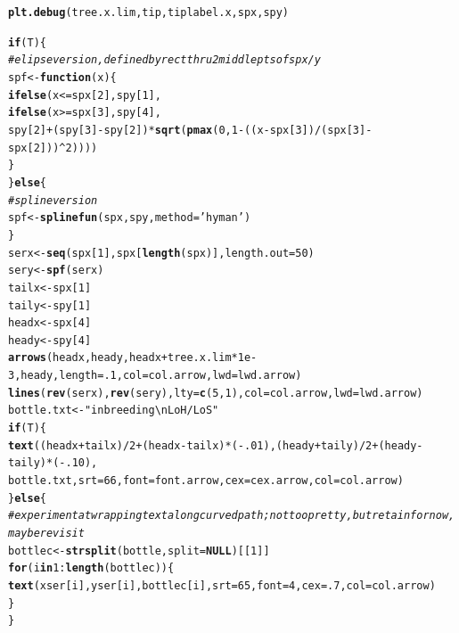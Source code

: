 \documentclass{article}\usepackage[]{graphicx}\usepackage[]{color}
\makeatletter
\newcommand{\hlnum}[1]{\textcolor[rgb]{0.686,0.059,0.569}{#1}}%
\newcommand{\hlstr}[1]{\textcolor[rgb]{0.192,0.494,0.8}{#1}}%
\newcommand{\hlcom}[1]{\textcolor[rgb]{0.678,0.584,0.686}{\textit{#1}}}%
\newcommand{\hlopt}[1]{\textcolor[rgb]{0,0,0}{#1}}%
\newcommand{\hlstd}[1]{\textcolor[rgb]{0.345,0.345,0.345}{#1}}%
\newcommand{\hlkwa}[1]{\textcolor[rgb]{0.161,0.373,0.58}{\textbf{#1}}}%
\newcommand{\hlkwb}[1]{\textcolor[rgb]{0.69,0.353,0.396}{#1}}%
\newcommand{\hlkwc}[1]{\textcolor[rgb]{0.333,0.667,0.333}{#1}}%
\newcommand{\hlkwd}[1]{\textcolor[rgb]{0.737,0.353,0.396}{\textbf{#1}}}%
\newenvironment{kframe}{%
 \def\at@end@of@kframe{}%
 \ifinner\ifhmode%
  \def\at@end@of@kframe{\end{minipage}}%
  \begin{minipage}{\columnwidth}%
 \fi\fi%
 \def\FrameCommand##1{\hskip\@totalleftmargin \hskip-\fboxsep
 \colorbox{shadecolor}{##1}\hskip-\fboxsep
     \hskip-\linewidth \hskip-\@totalleftmargin \hskip\columnwidth}%
 \MakeFramed {\advance\hsize-\width
   \@totalleftmargin\z@ \linewidth\hsize
   \@setminipage}}%
 {\par\unskip\endMakeFramed%
 \at@end@of@kframe}
\newenvironment{knitrout}{}{} %
\makeatother
\begin{document}
\begin{knitrout}
\begin{kframe}
\begin{alltt}
  \hlkwd{plt.debug}\hlstd{(tree.x.lim, tip, tiplabel.x, spx, spy)}

  \hlkwa{if}\hlstd{(T)\{}
    \hlcom{#elipse version, defined by rect thru 2 middle pts of spx/y}
    \hlstd{spf}\hlkwb{<-}\hlkwa{function}\hlstd{(}\hlkwc{x}\hlstd{)\{}
      \hlkwd{ifelse}\hlstd{(x} \hlopt{<=} \hlstd{spx[}\hlnum{2}\hlstd{], spy[}\hlnum{1}\hlstd{],}
             \hlkwd{ifelse}\hlstd{(x} \hlopt{>=} \hlstd{spx[}\hlnum{3}\hlstd{], spy[}\hlnum{4}\hlstd{],}
                    \hlstd{spy[}\hlnum{2}\hlstd{]}\hlopt{+}\hlstd{(spy[}\hlnum{3}\hlstd{]}\hlopt{-}\hlstd{spy[}\hlnum{2}\hlstd{])}\hlopt{*}\hlkwd{sqrt}\hlstd{(}\hlkwd{pmax}\hlstd{(}\hlnum{0}\hlstd{,}\hlnum{1}\hlopt{-}\hlstd{((x}\hlopt{-}\hlstd{spx[}\hlnum{3}\hlstd{])}\hlopt{/}\hlstd{(spx[}\hlnum{3}\hlstd{]}\hlopt{-}\hlstd{spx[}\hlnum{2}\hlstd{]))}\hlopt{^}\hlnum{2}\hlstd{))))}
      \hlstd{\}}
  \hlstd{\}} \hlkwa{else} \hlstd{\{}
    \hlcom{# spline version}
    \hlstd{spf} \hlkwb{<-} \hlkwd{splinefun}\hlstd{(spx,spy,}\hlkwc{method}\hlstd{=}\hlstr{'hyman'}\hlstd{)}
  \hlstd{\}}
  \hlstd{serx} \hlkwb{<-} \hlkwd{seq}\hlstd{(spx[}\hlnum{1}\hlstd{],spx[}\hlkwd{length}\hlstd{(spx)],}\hlkwc{length.out}\hlstd{=}\hlnum{50}\hlstd{)}
  \hlstd{sery} \hlkwb{<-} \hlkwd{spf}\hlstd{(serx)}
  \hlstd{tailx} \hlkwb{<-} \hlstd{spx[}\hlnum{1}\hlstd{]}
  \hlstd{taily} \hlkwb{<-} \hlstd{spy[}\hlnum{1}\hlstd{]}
  \hlstd{headx} \hlkwb{<-} \hlstd{spx[}\hlnum{4}\hlstd{]}
  \hlstd{heady} \hlkwb{<-} \hlstd{spy[}\hlnum{4}\hlstd{]}
  \hlkwd{arrows}\hlstd{(headx,heady,headx}\hlopt{+}\hlstd{tree.x.lim}\hlopt{*}\hlnum{1e-3}\hlstd{,heady,} \hlkwc{length}\hlstd{=}\hlnum{.1}\hlstd{,}\hlkwc{col}\hlstd{=col.arrow,}\hlkwc{lwd}\hlstd{=lwd.arrow)}
  \hlkwd{lines}\hlstd{(}\hlkwd{rev}\hlstd{(serx),} \hlkwd{rev}\hlstd{(sery),} \hlkwc{lty}\hlstd{=}\hlkwd{c}\hlstd{(}\hlnum{5}\hlstd{,}\hlnum{1}\hlstd{),}\hlkwc{col}\hlstd{=col.arrow,} \hlkwc{lwd}\hlstd{=lwd.arrow)}
  \hlstd{bottle.txt} \hlkwb{<-} \hlstr{"inbreeding\textbackslash{}nLoH / LoS"}
  \hlkwa{if}\hlstd{(T)\{}
    \hlkwd{text}\hlstd{((headx}\hlopt{+}\hlstd{tailx)}\hlopt{/}\hlnum{2}\hlopt{+}\hlstd{(headx}\hlopt{-}\hlstd{tailx)}\hlopt{*}\hlstd{(}\hlopt{-}\hlnum{.01}\hlstd{), (heady}\hlopt{+}\hlstd{taily)}\hlopt{/}\hlnum{2}\hlopt{+}\hlstd{(heady}\hlopt{-}\hlstd{taily)}\hlopt{*}\hlstd{(}\hlopt{-}\hlnum{.10}\hlstd{),}
         \hlstd{bottle.txt,} \hlkwc{srt}\hlstd{=}\hlnum{66}\hlstd{,} \hlkwc{font}\hlstd{=font.arrow,} \hlkwc{cex}\hlstd{=cex.arrow,} \hlkwc{col}\hlstd{=col.arrow)}
  \hlstd{\}} \hlkwa{else} \hlstd{\{}
    \hlcom{# experiment at wrapping text along curved path; not too pretty, but retain for now, maybe revisit}
    \hlstd{bottlec} \hlkwb{<-} \hlkwd{strsplit}\hlstd{(bottle,}\hlkwc{split}\hlstd{=}\hlkwa{NULL}\hlstd{)[[}\hlnum{1}\hlstd{]]}
    \hlkwa{for}\hlstd{(i} \hlkwa{in} \hlnum{1}\hlopt{:}\hlkwd{length}\hlstd{(bottlec))\{}
      \hlkwd{text}\hlstd{(xser[i],yser[i],bottlec[i],} \hlkwc{srt}\hlstd{=}\hlnum{65}\hlstd{,} \hlkwc{font}\hlstd{=}\hlnum{4}\hlstd{,} \hlkwc{cex}\hlstd{=}\hlnum{.7}\hlstd{,} \hlkwc{col}\hlstd{=col.arrow)}
    \hlstd{\}}
  \hlstd{\}}


\end{alltt}
\end{kframe}
\end{knitrout}
\end{document}
